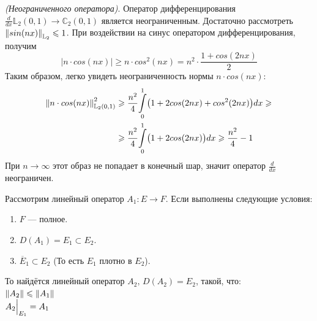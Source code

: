 \documentclass[12pt]{article}
\begin{document}
	\example \textit{(Неограниченного оператора)}. Оператор дифференцирования 
	$\frac{d}{dx} \mathbb{L}_2(0, 1) \rightarrow \mathbb{C}_2(0, 1)$ является неограниченным. 
	Достаточно рассмотреть $\left\| sin(nx) \right\|_{\mathbb{L}_2} \leqslant 1$. При воздействии на синус оператором дифференцирования, получим
	$$|n \cdot cos(nx)| \geq n \cdot cos^2(nx) = n^2 \cdot \frac{1 + cos(2nx)}{2}$$
	Таким образом, легко увидеть неограниченность нормы $n \cdot cos(nx)$:
	\begin{align*}
		\left\| n \cdot cos(nx) \right\|_{\mathbb{L}_2(0,1)}^2 
		&\geqslant \frac{n^2}{4} \underset{0}{\overset{1}{\int}} \big(1 + 2 cos(2nx) + cos^2(2nx)\big) dx \geqslant \\
		&\geqslant \frac{n^2}{4} \underset{0}{\overset{1}{\int}} \big(1 + 2 cos(2nx)\big) dx \geqslant \frac{n^2}{4} - 1
	\end{align*}
	При $n \rightarrow \infty$ этот образ не попадает в конечный шар, значит оператор $\frac{d}{dx}$ неограничен.
	
	
	\begin{theorem} \label{th:limitedOperContinue}
		Рассмотрим линейный оператор $A_1 : E \rightarrow F$. Если выполнены следующие условия:
		\begin{enumerate}
			\item $F$ --- полное.
			\item $D(A_1) = E_1 \subset E_2$.
			\item $\overline{E}_1 \subset E_2$ (То есть $E_1$ плотно в $E_2$).
		\end{enumerate}
		То найдётся линейный оператор $A_2,\, D(A_2) = E_2$, такой, что: \\
		$\left\| A_2 \right\| \leqslant \left\| A_1 \right\|$ \\
		$A_2 \Big|_{E_1}^{} = A_1$
	\end{theorem}
	
\end{document}
